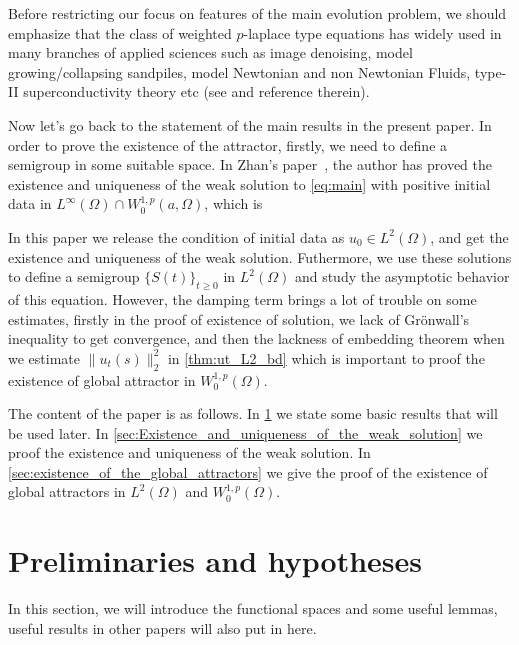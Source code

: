 \documentclass[11pt]{amsart}
\theoremstyle{definition}
\numberwithin{equation}{section}
\newcommand*\norm[1]{\lVert#1\rVert}
\newcommand*\Brace[1]{\lbrace#1\rbrace}
\begin{document}
Before restricting our focus on features of the main evolution problem,
we should emphasize that the class of weighted $p$-laplace type equations
has widely used in many branches of applied sciences such as image
denoising, model growing/collapsing sandpiles, model Newtonian and non Newtonian Fluids, type-II superconductivity theory etc (see \autocite{aronssonFastSlowDiffusion1996,aubertMathematicalProblemsImage2006,mastorakisSolutionPLaplacianNonNewtonian2009,yinLaplacianTypeEvolution2001} and reference therein).

Now let's go back to the statement of the main results in the present paper. In order to prove the existence of the attractor, firstly, we need to define a semigroup in some suitable space. In Zhan's paper~\cite{Zhan2019Uniquenessa}, the author has proved the existence and uniqueness of the weak solution to \cref{eq:main} with positive initial data in $L^{\infty}(\Omega) \cap W_0^{1,p}(a,\Omega)$, which is

In this paper we release the condition of initial data as
$u_0 \in L^2(\Omega)$, and get the existence and
uniqueness of the weak solution. Futhermore, we use
these solutions to define a semigroup $\Brace{S(t)}_{t \geq 0} $ in $L^2(\Omega) $ and study the asymptotic behavior of this equation. However,
the damping term brings a lot of trouble on some estimates, firstly in
the proof of existence of solution, we lack of Gr\"onwall's inequality
to get convergence, and then the lackness of embedding theorem when we
estimate $\norm{u_t(s)}_2^2$ in \cref{thm:ut_L2_bd} which is important
to proof the existence of global attractor in $W_0^{1,p}(\Omega)$.

The content of the paper is as follows.
In \cref{sec:preliminaries}
we state some basic results that will be used later. In
\cref{sec:Existence_and_uniqueness_of_the_weak_solution}
we proof the existence and uniqueness of the weak solution.
In \cref{sec:existence_of_the_global_attractors}
we give the proof of the existence of global attractors in
$L^2(\Omega)$ and $W_0^{1,p}(\Omega)$.
\section{Preliminaries and hypotheses}\label{sec:preliminaries}
In this section, we will introduce the functional spaces and some
useful lemmas, useful results in other papers will also put in here.
\end{document}
